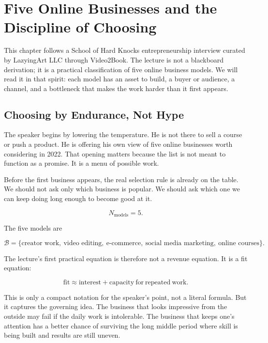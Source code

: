 \chapter{Five Online Businesses and the Discipline of Choosing}

This chapter follows a School of Hard Knocks entrepreneurship interview curated by LazyingArt LLC through Video2Book. The lecture is not a blackboard derivation; it is a practical classification of five online business models. We will read it in that spirit: each model has an asset to build, a buyer or audience, a channel, and a bottleneck that makes the work harder than it first appears.

\section{Choosing by Endurance, Not Hype}

The speaker begins by lowering the temperature. He is not there to sell a course or push a product. He is offering his own view of five online businesses worth considering in 2022. That opening matters because the list is not meant to function as a promise. It is a menu of possible work.

Before the first business appears, the real selection rule is already on the table. We should not ask only which business is popular. We should ask which one we can keep doing long enough to become good at it.

\begin{equation}
N_{\mathrm{models}} = 5 .
\end{equation}

The five models are

\begin{equation}
\mathcal{B}
=
\{\text{creator work},\ \text{video editing},\ \text{e-commerce},\ \text{social media marketing},\ \text{online courses}\}.
\end{equation}

The lecture's first practical equation is therefore not a revenue equation. It is a fit equation:

\begin{equation}
\mathrm{fit}
\approx
\mathrm{interest}
+
\mathrm{capacity\ for\ repeated\ work}.
\end{equation}

This is only a compact notation for the speaker's point, not a literal formula. But it captures the governing idea. The business that looks impressive from the outside may fail if the daily work is intolerable. The business that keeps one's attention has a better chance of surviving the long middle period where skill is being built and results are still uneven.

